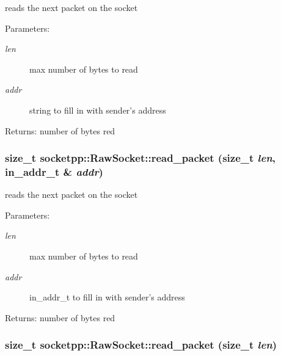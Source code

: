 reads the next packet on the socket 

\begin{Desc}
\item[Parameters:]
\begin{description}
\item[{\em len}]max number of bytes to read \item[{\em addr}]string to fill in with sender's address \end{description}
\end{Desc}
\begin{Desc}
\item[Returns:]number of bytes red \end{Desc}
\hypertarget{classsocketpp_1_1RawSocket_08b8bec945928764f2d7ee11890b8625}{
\subsubsection{\setlength{\rightskip}{0pt plus 5cm}size\_\-t socketpp::RawSocket::read\_\-packet (size\_\-t {\em len}, \/  in\_\-addr\_\-t \& {\em addr})}}
\label{classsocketpp_1_1RawSocket_08b8bec945928764f2d7ee11890b8625}


reads the next packet on the socket 

\begin{Desc}
\item[Parameters:]
\begin{description}
\item[{\em len}]max number of bytes to read \item[{\em addr}]in\_\-addr\_\-t to fill in with sender's address \end{description}
\end{Desc}
\begin{Desc}
\item[Returns:]number of bytes red \end{Desc}
\hypertarget{classsocketpp_1_1RawSocket_ea48bec4596e2afc89adba2ccb13f6c8}{
\subsubsection{\setlength{\rightskip}{0pt plus 5cm}size\_\-t socketpp::RawSocket::read\_\-packet (size\_\-t {\em len})}}
\label{classsocketpp_1_1RawSocket_ea48bec4596e2afc89adba2ccb13f6c8}


